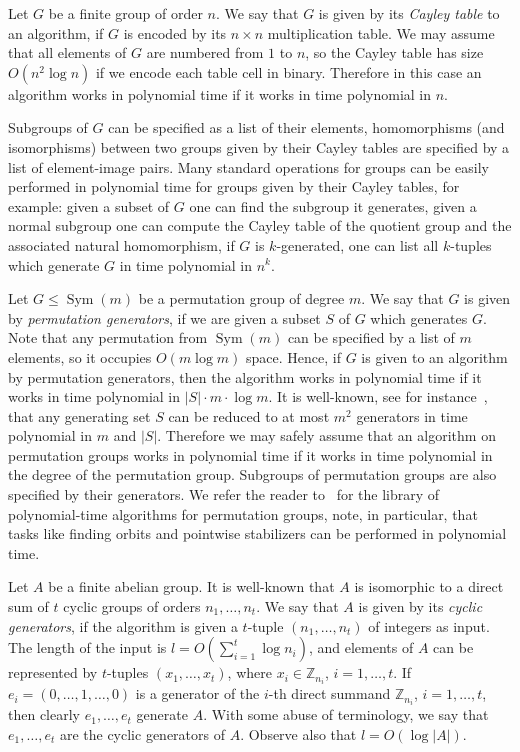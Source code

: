 \documentclass{article}
\DeclareMathOperator{\Sym}{Sym}
\begin{document}
Let \( G \) be a finite group of order \( n \). We say that \( G \) is given by its \emph{Cayley table} to an algorithm,
if \( G \) is encoded by its \( n \times n \) multiplication table. We may assume that all elements of \( G \)
are numbered from \( 1 \) to \( n \), so the Cayley table has size \( O(n^2 \log n) \) if we encode each table cell in binary.
Therefore in this case an algorithm works in polynomial time if it works in time polynomial in \( n \).

Subgroups of \( G \) can be specified as a list of their elements, homomorphisms (and isomorphisms) between two groups given by their Cayley tables
are specified by a list of element-image pairs. Many standard operations for groups can be easily performed in polynomial time for groups given by their Cayley tables,
for example: given a subset of \( G \) one can find the subgroup it generates, given a normal subgroup one can compute the Cayley table of
the quotient group and the associated natural homomorphism, if \( G \) is \( k \)-generated, one can list all \( k \)-tuples which generate \( G \)
in time polynomial in \( n^k \).

Let \( G \leq \Sym(m) \) be a permutation group of degree \( m \). We say that \( G \) is given by \emph{permutation generators},
if we are given a subset \( S \) of \( G \) which generates \( G \). Note that any permutation from \( \Sym(m) \)
can be specified by a list of \( m \) elements, so it occupies \( O(m \log m) \) space. 
Hence, if \( G \) is given to an algorithm by permutation generators, then the algorithm works in polynomial time
if it works in time polynomial in \( |S|\cdot m \cdot \log m \). It is well-known, see for instance~\cite[Exercise~4.1]{seress},
that any generating set \( S \) can be reduced to at most \( m^2 \) generators in time polynomial in \( m \) and \( |S| \). Therefore
we may safely assume that an algorithm on permutation groups works in polynomial time if it works in time polynomial in the degree of the permutation group.
Subgroups of permutation groups are also specified by their generators.
We refer the reader to~\cite[Section~3.1]{seress} for the library of polynomial-time algorithms for permutation groups, note, in particular,
that tasks like finding orbits and pointwise stabilizers can be performed in polynomial time.

Let \( A \) be a finite abelian group. It is well-known that \( A \) is isomorphic to a
direct sum of \( t \) cyclic groups of orders \( n_1, \dots, n_t \).
We say that \( A \) is given by its \emph{cyclic generators}, if the algorithm is given a \( t \)-tuple \( (n_1, \dots, n_t) \) of integers as input.
The length of the input is \( l = O(\sum_{i=1}^t \log n_i) \), and elements of \( A \) can be represented by \( t \)-tuples \( (x_1, \dots, x_t) \),
where \( x_i \in \mathbb{Z}_{n_i} \), \( i = 1, \dots, t \). If \( e_i = (0, \dots, 1, \dots, 0) \) is a generator of the \( i \)-th direct summand
\( \mathbb{Z}_{n_i} \), \( i = 1, \dots, t \), then clearly \( e_1, \dots, e_t \) generate \( A \). With some abuse of terminology, we
say that \( e_1, \dots, e_t \) are the cyclic generators of \( A \). Observe also that \( l = O(\log |A|) \).
\end{document}
